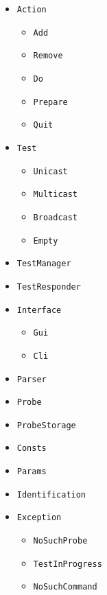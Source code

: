 \documentclass[a4paper,11pt]{article}
\newcommand{\cd}[1]{\texttt{#1}}
\begin{document}
\begin{appendices}
\begin{itemize}
\item \cd{Action} 
	\begin{itemize}
	\item \cd{Add}
	\item \cd{Remove}
	\item \cd{Do}
	\item \cd{Prepare}
	\item \cd{Quit}
	\end{itemize}

\item \cd{Test}
	\begin{itemize}
	\item \cd{Unicast}
	\item \cd{Multicast}
	\item \cd{Broadcast}
	\item \cd{Empty}
	\end{itemize}

\item \cd{TestManager}
\item \cd{TestResponder}

\item \cd{Interface}
	\begin{itemize}
	\item \cd{Gui}
	\item \cd{Cli}
	\end{itemize}
\item \cd{Parser}

\item \cd{Probe}
\item \cd{ProbeStorage}
\item \cd{Consts}
\item \cd{Params}
\item \cd{Identification}

\item \cd{Exception}
	\begin{itemize}
	\item \cd{NoSuchProbe}
	\item \cd{TestInProgress}
	\item \cd{NoSuchCommand}
	\end{itemize}
\end{itemize}
\end{appendices}
\end{document}

